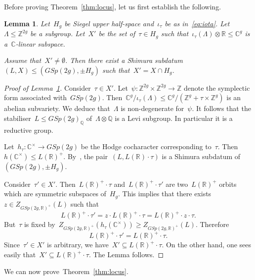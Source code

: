 \documentclass[12pt]{amsart}
\newtheorem{lemma}[theorem]{Lemma}
\newcommand{\R}{{\mathbb R}}
\newcommand{\Z}{{\mathbb Z}}
\newcommand{\Q}{{\mathbb Q}}
\newcommand{\C}{{\mathbb C}}
\newcommand{\tens}{\otimes}
\begin{document}
Before proving Theorem~\ref{thm:locus}, let us first establish the following.
\begin{lemma}\label{lem:locus}
Let~$H_g$ be Siegel upper half-space and~$\iota_\tau$ be as in~\eqref{eq:iota}. Let~$\Lambda\leq \Z^{2g}$ be a subgroup. Let~$X'$ be the set of~$\tau\in H_g$ such that~$\iota_\tau(\Lambda)\tens\R\leq \C^g$ is a~$\C$-linear subspace.

Assume that~$X'\neq\emptyset$.
Then there exist a Shimura subdatum~$(L,X)\leq (GSp(2g),\pm H_g)$ such that~$X'=X\cap H_g$.
\end{lemma}
\begin{proof}[Proof of Lemma~\ref{lem:locus}]
Consider~$\tau\in X'$. Let~$\psi:\Z^{2g}\times \Z^{2g}\to \Z$ denote the symplectic form associated with~$GSp(2g)$.
Then~$\C^g/\iota_\tau(\Lambda)\leq \C^g/(\Z^g+\tau\times\Z^g)$ is an abelian subvariety. We deduce that~$\Lambda$ is non-degenerate for~$\psi$. It follows that the stabiliser~$L\leq GSp(2g)_\Q$ of~$\Lambda\tens\Q$ is a Levi subgroup. In particular it is a reductive group. 

Let~$h_\tau:\C^\times\to GSp(2g)$ be the Hodge cocharacter corresponding to~$\tau$. Then~$h(\C^\times)\leq L(\R)^+$.
By~\cite[Prop. 3.2]{CU}, the pair~$(L,L(\R)\cdot \tau)$ is a Shimura subdatum of~$(GSp(2g),\pm H_g)$.

Consider~$\tau'\in X'$. Then~$L(\R)^+\cdot \tau$ and~$L(\R)^+\cdot \tau'$ are two~$L(\R)^+$ orbits which are symmetric subspaces of~$H_g$. This implies that there exists~$z\in Z_{GSp(2g,\R)^+}(L)$ such that
\[
L(\R)^+\cdot \tau'=z\cdot L(\R)^+\cdot \tau=L(\R)^+\cdot z\cdot \tau.
\]
But~$\tau$ is fixed by~$Z_{GSp(2g,\R)^+}(h_\tau(\C^\times))\geq Z_{GSp(2g,\R)^+}(L)$.
Therefore
\[
L(\R)^+\cdot \tau'=L(\R)^+\cdot \tau.
\]
Since~$\tau'\in X'$ is arbitrary, we have~$X'\subseteq L(\R)^+\cdot \tau$. On the other hand, one sees easily that~$X'\subseteq  L(\R)^+\cdot \tau$. The Lemma follows.
\end{proof}
We can now prove~Theorem~\ref{thm:locus}.
\end{document}
